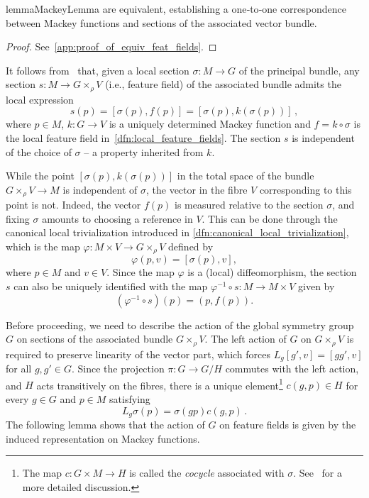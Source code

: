 \documentclass[12pt,a4paper]{article}
\numberwithin{equation}{section}
\theoremstyle{plain}
\theoremstyle{definition}
\theoremstyle{remark}
\begin{document}
\begin{restatable}{lemma}{MackeyLemma}\label{lem:feature_fields}
     are equivalent, establishing a one‑to‑one correspondence between Mackey functions and sections of the associated vector bundle.
\end{restatable}

\begin{proof}
    See~\cref{app:proof_of_equiv_feat_fields}.
\end{proof}

It follows from~ that, given a local section $\sigma:M \to G$ of the principal bundle, any section $s:M \to G\times_\rho V$ (i.e., feature field) of the associated bundle admits the local expression
\begin{equation}
    s(p) = \left[\sigma(p),f(p)\right] = \left[\sigma(p),k(\sigma(p))\right]\,,
\end{equation}
where $p\in M$, $k:G\to V$ is a uniquely determined Mackey function and $f=k\circ\sigma$ is the local feature field in~\cref{dfn:local_feature_fields}. The section $s$ is independent of the choice of $\sigma$ -- a property inherited from $k$.

While the point $[\sigma(p),k(\sigma(p))]$ in the total space of the bundle $G \times_{\rho} V \to M$ is independent of $\sigma$, the vector in the fibre $V$ corresponding to this point is not. Indeed, the vector $f(p)$ is measured relative to the section $\sigma$, and fixing $\sigma$ amounts to choosing a reference in $V$. This can be done through the canonical local trivialization introduced in \cref{dfn:canonical_local_trivialization}, which is the map $\varphi:M\times V\to G\times_\rho V$ defined by
\begin{equation}
        \varphi(p,v)=[\sigma(p),v],
\end{equation}
where $p\in M$ and $v\in V$. Since the map $\varphi$ is a (local) diffeomorphism, the section $s$ can also be uniquely identified with the map $\varphi^{-1}\circ s:M\to M\times V$ given by
\begin{equation}
    (\varphi^{-1}\circ s)(p)=(p,f(p)).
\end{equation}

Before proceeding, we need to describe the action of the global symmetry group $G$ on sections of the associated bundle $G \times_{\rho} V$. The left action of $G$ on $G \times_{\rho} V$ is required to preserve linearity of the vector part, which forces $L_g[g',v] = [gg',v]$ for all $g,g' \in G$. Since the projection $\pi: G \to G/H$ commutes with the left action, and $H$ acts transitively on the fibres, there is a unique element\footnote{The map $c : G \times M \to H$ is called the \textit{cocycle} associated with $\sigma$. See~\cite{Cohen2019b} for a more detailed discussion.} $c(g,p) \in H$ for every $g \in G$ and $p \in M$ satisfying
\begin{equation}\label{eq:cocycle}
    L_g\sigma(p) = \sigma(gp)c(g,p)\,.
\end{equation}
The following lemma shows that the action of $G$ on feature fields is given by the induced representation on Mackey functions.
\end{document}
